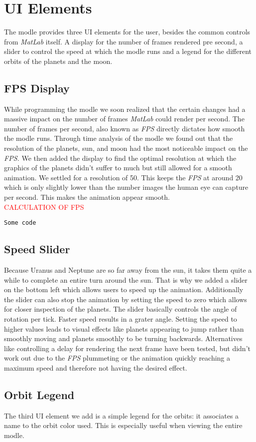 \chapter{UI Elements}

The modle provides three UI elements for the user, besides the common controls from {\em MatLab} itself. A display for the number of frames rendered pre second, a slider to control the speed at which the modle runs and a legend for the different orbits of the planets and the moon.

\section{FPS Display}
While programming the modle we soon realized that the certain changes had a massive impact on the number of frames {\em MatLab} could render per second. The number of frames per second, also known as {\em FPS} directly dictates how smooth the modle runs. Through time analysis of the modle we found out that the resolution of the planets, sun, and moon had the most noticeable impact on the {\em FPS.} We then added the display to find the optimal resolution at which the graphics of the planets didn't suffer to much but still allowed for a smooth animation. We settled for a resolution of 50. This keeps the {\em FPS} at around 20 which is only slightly lower than the number images the human eye can capture per second. This makes the animation appear smooth.\\

\textcolor{red}{CALCULATION OF FPS}
\begin{framed}\begin{verbatim}
Some code
\end{verbatim}\end{framed}


\section{Speed Slider}
Because Uranus and Neptune are so far away from the sun, it takes them quite a while to complete an entire turn around the sun. That is why we added a slider on the bottom left which allows users to speed up the animation. Additionally the slider can also stop the animation by setting the speed to zero which allows for closer inspection of the planets. The slider basically controls the angle of rotation per tick. Faster speed results in a grater angle. Setting the speed to higher values leads to visual effects like planets appearing to jump rather than smoothly moving and planets smoothly to be turning backwards. Alternatives like controlling a delay for rendering the next frame have been tested, but didn't work out due to the {\em FPS} plummeting or the animation quickly reaching a maximum speed and therefore not having the desired effect.

\section{Orbit Legend}
The third UI element we add is a simple legend for the orbits: it associates a name to the orbit color used. This is especially useful when viewing the entire modle.
